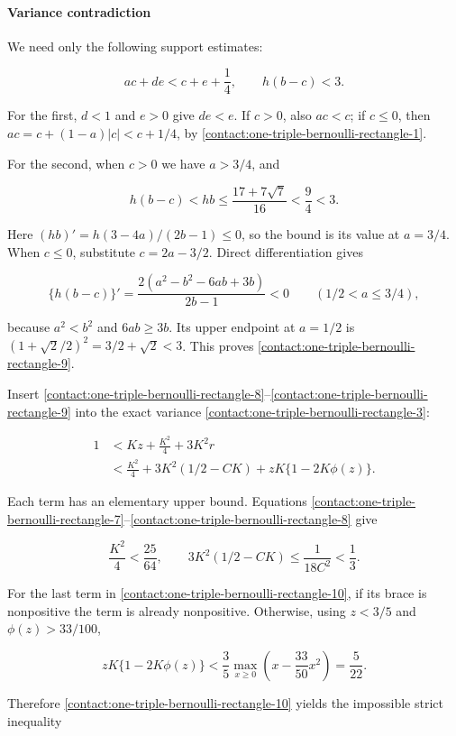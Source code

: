 \paragraph{Variance contradiction}

We need only the following support estimates:

\[
 ac+de<c+e+\frac14,\qquad h(b-c)<3.
\tag{B.9.9}\label{contact:one-triple-bernoulli-rectangle-9}
\]

For the first, $d<1$ and $e>0$ give $de<e$. If $c>0$, also
$ac<c$; if $c\le 0$, then
$ac=c+(1-a)|c|<c+1/4$, by \eqref{contact:one-triple-bernoulli-rectangle-1}.

For the second, when $c>0$ we have $a>3/4$, and

\[
 h(b-c)<hb\leq\frac{17+7\sqrt7}{16}<\frac94<3.
\]

Here $(hb)'=h(3-4a)/(2b-1)\le 0$, so the bound is its value at $a=3/4$.
When $c\le 0$, substitute $c=2a-3/2$. Direct differentiation gives

\[
 \{h(b-c)\}'=
 \frac{2(a^2-b^2-6ab+3b)}{2b-1}<0
 \qquad(1/2<a\le3/4),
\]

because $a^2<b^2$ and $6ab\ge 3b$. Its upper endpoint at $a=1/2$ is
$(1+\sqrt{2}/2)^2=3/2+\sqrt{2}<3$. This proves \eqref{contact:one-triple-bernoulli-rectangle-9}.

Insert \eqref{contact:one-triple-bernoulli-rectangle-8}--\eqref{contact:one-triple-bernoulli-rectangle-9} into the exact variance \eqref{contact:one-triple-bernoulli-rectangle-3}:

\[
 \begin{aligned}
 1
 &<Kz+\frac{K^2}{4}+3K^2r\\
 &<\frac{K^2}{4}+3K^2(1/2-CK)
       +zK\{1-2K\phi(z)\}.
 \end{aligned}
\tag{B.9.10}\label{contact:one-triple-bernoulli-rectangle-10}
\]

Each term has an elementary upper bound. Equations \eqref{contact:one-triple-bernoulli-rectangle-7}--\eqref{contact:one-triple-bernoulli-rectangle-8} give

\[
 \frac{K^2}{4}<\frac{25}{64},\qquad
 3K^2(1/2-CK)\leq\frac1{18C^2}<\frac13.
\]

For the last term in \eqref{contact:one-triple-bernoulli-rectangle-10}, if its brace is nonpositive the term is
already nonpositive. Otherwise, using $z<3/5$ and $\phi(z)>33/100$,

\[
 zK\{1-2K\phi(z)\}
 <\frac35\max_{x\geq0}\left(x-\frac{33}{50}x^2\right)
 =\frac5{22}.
\]

Therefore \eqref{contact:one-triple-bernoulli-rectangle-10} yields the impossible strict inequality

